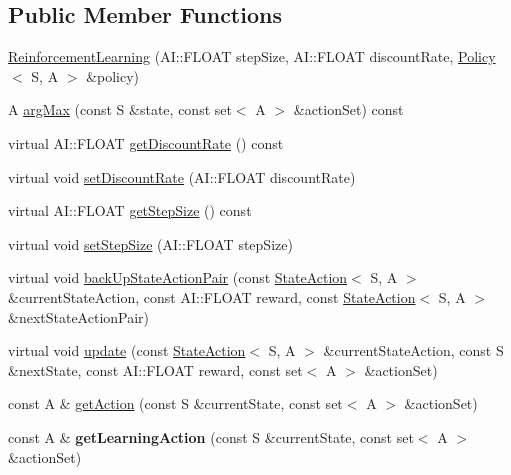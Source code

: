 \subsection*{Public Member Functions}
\begin{DoxyCompactItemize}
\item 
\hyperlink{classAI_1_1Algorithm_1_1ReinforcementLearning_a9700b470cb894d43e0db7aedd80576f1}{Reinforcement\-Learning} (A\-I\-::\-F\-L\-O\-A\-T step\-Size, A\-I\-::\-F\-L\-O\-A\-T discount\-Rate, \hyperlink{classAI_1_1Algorithm_1_1Policy}{Policy}$<$ S, A $>$ \&policy)
\item 
A \hyperlink{classAI_1_1Algorithm_1_1ReinforcementLearning_ad1d8a8ebb47fb71a53b15b770795e286}{arg\-Max} (const S \&state, const set$<$ A $>$ \&action\-Set) const 
\item 
virtual A\-I\-::\-F\-L\-O\-A\-T \hyperlink{classAI_1_1Algorithm_1_1ReinforcementLearning_a04edb957e23dde9c6733668ad844c32b}{get\-Discount\-Rate} () const 
\item 
virtual void \hyperlink{classAI_1_1Algorithm_1_1ReinforcementLearning_a1fc1e11a3ddb4377c4d6813a95ce87f4}{set\-Discount\-Rate} (A\-I\-::\-F\-L\-O\-A\-T discount\-Rate)
\item 
virtual A\-I\-::\-F\-L\-O\-A\-T \hyperlink{classAI_1_1Algorithm_1_1ReinforcementLearning_a13e6c161a33644183d3d357971eeaaf5}{get\-Step\-Size} () const 
\item 
virtual void \hyperlink{classAI_1_1Algorithm_1_1ReinforcementLearning_a04932645faa6c385e4c587f7f845b484}{set\-Step\-Size} (A\-I\-::\-F\-L\-O\-A\-T step\-Size)
\item 
virtual void \hyperlink{classAI_1_1Algorithm_1_1ReinforcementLearning_aa45b49ec954f6934df4d541b70076bd6}{back\-Up\-State\-Action\-Pair} (const \hyperlink{classAI_1_1StateAction}{State\-Action}$<$ S, A $>$ \&current\-State\-Action, const A\-I\-::\-F\-L\-O\-A\-T reward, const \hyperlink{classAI_1_1StateAction}{State\-Action}$<$ S, A $>$ \&next\-State\-Action\-Pair)
\item 
virtual void \hyperlink{classAI_1_1Algorithm_1_1ReinforcementLearning_a25d7fa245a79e61061436dc0f1db90cb}{update} (const \hyperlink{classAI_1_1StateAction}{State\-Action}$<$ S, A $>$ \&current\-State\-Action, const S \&next\-State, const A\-I\-::\-F\-L\-O\-A\-T reward, const set$<$ A $>$ \&action\-Set)
\item 
const A \& \hyperlink{classAI_1_1Algorithm_1_1ReinforcementLearning_acb89c1734df6658a422af510b7c36377}{get\-Action} (const S \&current\-State, const set$<$ A $>$ \&action\-Set)
\item 
\hypertarget{classAI_1_1Algorithm_1_1ReinforcementLearning_a9f31822bf51b07d17b31d7683d7e25a2}{const A \& {\bfseries get\-Learning\-Action} (const S \&current\-State, const set$<$ A $>$ \&action\-Set)}\label{classAI_1_1Algorithm_1_1ReinforcementLearning_a9f31822bf51b07d17b31d7683d7e25a2}


\end{DoxyCompactItemize}
